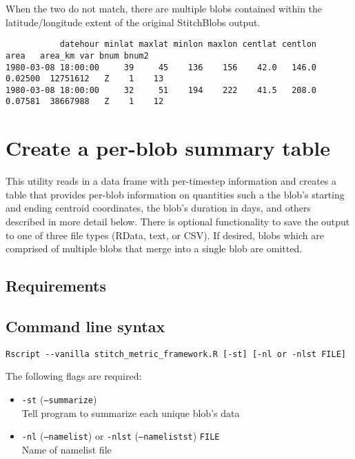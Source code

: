 \documentclass{article}
\begin{document}
When the two do not match, there are multiple blobs contained within the latitude/longitude extent of the original StitchBlobs output.

\begin{verbatim}
           datehour minlat maxlat minlon maxlon centlat centlon    area   area_km var bnum bnum2
1980-03-08 18:00:00     39     45    136    156    42.0   146.0 0.02500  12751612   Z    1    13
1980-03-08 18:00:00     32     51    194    222    41.5   208.0 0.07581  38667988   Z    1    12
\end{verbatim}

\section{Create a per-blob summary table}\label{summarysection}
This utility reads in a data frame with per-timestep information and creates a table that provides per-blob information on quantities such a the blob's starting and ending centroid coordinates, the blob's duration in days, and others described in more detail below.  There is optional functionality to save the output to one of three file types (RData, text, or CSV). If desired, blobs which are comprised of multiple blobs that merge into a single blob are omitted.

\subsection{Requirements}


\subsection{Command line syntax}

\begin{verbatim}
Rscript --vanilla stitch_metric_framework.R [-st] [-nl or -nlst FILE]
\end{verbatim}

The following flags are required:
\begin{itemize}
\item[] \texttt{-st} (\texttt{--summarize})\\ Tell program to summarize each unique blob's data
\item[]\texttt{-nl} (\texttt{--namelist}) or \texttt{-nlst} (\texttt{--namelistst}) \texttt{FILE}\\ Name of namelist file
\end{itemize}
\end{document}
